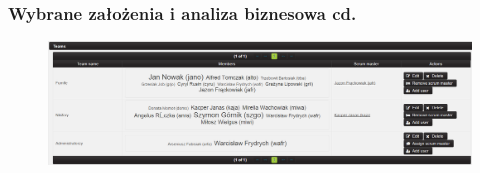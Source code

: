 \documentclass[hyperref={pdfpagelabels=false}]{beamer}
\begin{document}
\begin{frame}
	\frametitle{Wybrane założenia i analiza biznesowa cd.}
	\begin{figure}
		\centering
		\includegraphics[height=0.5\linewidth, width=1\linewidth]{team-list}
	\end{figure}
\end{frame}
\end{document}

